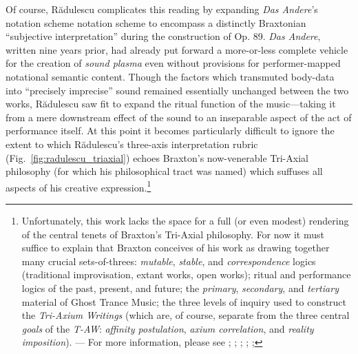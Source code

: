     Of course, R\u{a}dulescu complicates this reading by expanding \textit{Das Andere}'s notation scheme notation scheme to encompass a distinctly Braxtonian ``subjective interpretation'' during the construction of Op. 89. \textit{Das Andere}, written nine years prior, had already put forward a more-or-less complete vehicle for the creation of \textit{sound plasma} even without provisions for performer-mapped notational semantic content. Though the factors which transmuted body-data into ``precisely imprecise'' sound remained essentially unchanged between the two works, R\u{a}dulescu saw fit to expand the ritual function of the music---taking it from a mere downstream effect of the sound to an inseparable aspect of the act of performance itself. At this point it becomes particularly difficult to ignore the extent to which R\u{a}dulescu's three-axis interpretation rubric (Fig.~\ref{fig:radulescu_triaxial}) echoes Braxton's now-venerable Tri-Axial philosophy (for which his philosophical tract was named) which suffuses all aspects of his creative expression.\footnote{Unfortunately, this work lacks the space for a full (or even modest) rendering of the central tenets of Braxton's Tri-Axial philosophy. For now it must suffice to explain that Braxton conceives of his work as drawing together many crucial sets-of-threes: \textit{mutable}, \textit{stable}, and \textit{correspondence} logics (traditional improvisation, extant works, open works); ritual and performance logics of the past, present, and future; the \textit{primary}, \textit{secondary}, and \textit{tertiary} material of Ghost Trance Music; the three levels of inquiry used to construct the \textit{Tri-Axium Writings} (which are, of course, separate from the three central \textit{goals} of the \textit{T-AW}: \textit{affinity postulation}, \textit{axium correlation}, and \textit{reality imposition}). --- For more information, please see ; ; ; ; ; }
    
